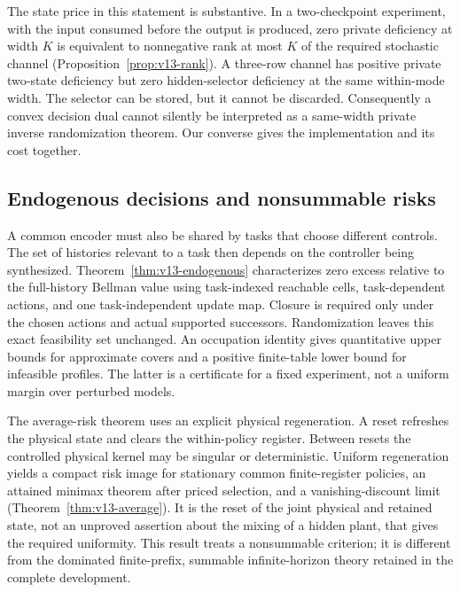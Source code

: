 The state price in this statement is substantive. In a two-checkpoint
experiment, with the input consumed before the output is produced,
zero private deficiency at width $K$ is equivalent to nonnegative rank
at most $K$ of the required stochastic channel
(Proposition~\ref{prop:v13-rank}). A three-row channel has positive private
two-state deficiency but zero hidden-selector deficiency at the same
within-mode width. The selector can be stored, but it cannot be discarded.
Consequently a convex decision dual cannot silently be interpreted as a
same-width private inverse randomization theorem. Our converse gives the
implementation and its cost together.

\subsection{Endogenous decisions and nonsummable risks}
A common encoder must also be shared by tasks that choose different
controls. The set of histories relevant to a task then depends on the
controller being synthesized. Theorem~\ref{thm:v13-endogenous} characterizes
zero excess relative to the full-history Bellman value using task-indexed
reachable cells, task-dependent actions, and one task-independent update
map. Closure is required only under the chosen actions and actual
supported successors. Randomization leaves this exact feasibility set
unchanged. An occupation identity gives quantitative upper bounds for
approximate covers and a positive finite-table lower bound for infeasible
profiles. The latter is a certificate for a fixed experiment, not a
uniform margin over perturbed models.

The average-risk theorem uses an explicit physical regeneration. A reset
refreshes the physical state and clears the within-policy register. Between
resets the controlled physical kernel may be singular or deterministic.
Uniform regeneration yields a compact risk image for stationary common
finite-register policies, an attained minimax theorem after priced
selection, and a vanishing-discount limit
(Theorem~\ref{thm:v13-average}). It is the reset of the joint physical and
retained state, not an unproved assertion about the mixing of a hidden
plant, that gives the required uniformity. This result treats a
nonsummable criterion; it is different from the dominated finite-prefix,
summable infinite-horizon theory retained in the complete development.

